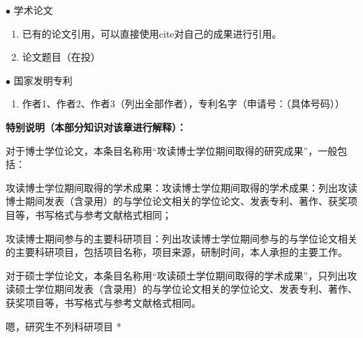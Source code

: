 \achievement

\noindent $\bullet$ \quad 学术论文

\begin{enumerate}
	\item 已有的论文引用，可以直接使用cite对自己的成果进行引用。
	\item 论文题目（在投）
\end{enumerate}

\noindent $\bullet$ \quad 国家发明专利
\begin{enumerate}
	\item 作者1、作者2、作者3（列出全部作者），专利名字（申请号：（具体号码））
\end{enumerate}

\noindent \textbf{特别说明（本部分知识对该章进行解释）：}

对于博士学位论文，本条目名称用“攻读博士学位期间取得的研究成果”，一般包括：

攻读博士学位期间取得的学术成果：攻读博士学位期间取得的学术成果：列出攻读博士期间发表（含录用）的与学位论文相关的学位论文、发表专利、著作、获奖项目等，书写格式与参考文献格式相同；

攻读博士期间参与的主要科研项目：列出攻读博士学位期间参与的与学位论文相关的主要科研项目，包括项目名称，项目来源，研制时间，本人承担的主要工作。

对于硕士学位论文，本条目名称用“攻读硕士学位期间取得的学术成果”，只列出攻读硕士学位期间发表（含录用）的与学位论文相关的学位论文、发表专利、著作、获奖项目等，书写格式与参考文献格式相同。

\par * 嗯，研究生不列科研项目 * \par
